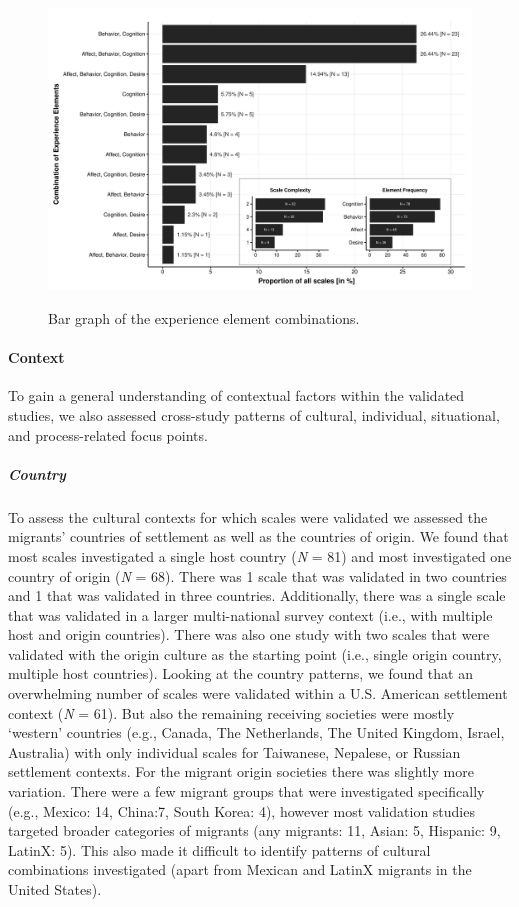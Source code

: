 \begin{figure}[h]
\centering
\caption{Bar graph of the experience element combinations.}
\includegraphics[width=\textwidth]{Figures/ABCDFreq-1}
\label{fig:ElementsScales}
\end{figure}



\paragraph{Context}

To gain a general understanding of contextual factors within the
validated studies, we also assessed cross-study patterns of cultural,
individual, situational, and process-related focus points.

\subparagraph{Country}

To assess the cultural contexts for which scales were validated we
assessed the migrants' countries of settlement as well as the countries
of origin. We found that most scales investigated a single host country
(\textit{N} = 81) and most investigated one country of origin
(\textit{N} = 68). There was 1 scale that was validated in two countries
and 1 that was validated in three countries. Additionally, there was a
single scale that was validated in a larger multi-national survey
context (i.e., with multiple host and origin countries). There was also
one study with two scales that were validated with the origin culture as
the starting point (i.e., single origin country, multiple host
countries). Looking at the country patterns, we found that an
overwhelming number of scales were validated within a U.S. American
settlement context (\textit{N} = 61). But also the remaining receiving
societies were mostly `western' countries (e.g., Canada, The
Netherlands, The United Kingdom, Israel, Australia) with only individual
scales for Taiwanese, Nepalese, or Russian settlement contexts. For the
migrant origin societies there was slightly more variation. There were a
few migrant groups that were investigated specifically (e.g., Mexico:
14, China:7, South Korea: 4), however most validation studies targeted
broader categories of migrants (any migrants: 11, Asian: 5, Hispanic: 9,
LatinX: 5). This also made it difficult to identify patterns of cultural
combinations investigated (apart from Mexican and LatinX migrants in the
United States).

